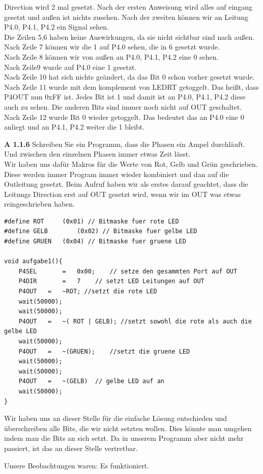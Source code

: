 \documentclass[a4paper,ngerman]{article}
\begin{document}
\begin{description}
Direction wird 2 mal gesetzt. Nach der ersten Anweisung wird alles auf eingang gesetzt und außen ist nichts zusehen. Nach der zweiten können wir an Leitung P4.0, P4.1, P4.2 ein Signal sehen.\\
Die Zeilen 5,6 haben keine Auswirkungen, da sie nicht sichtbar sind nach außen.\\
Nach Zeile 7 können wir die 1 auf P4.0 sehen, die in 6 gesetzt wurde.\\
Nach Zeile 8 können wir von außen an P4.0, P4.1, P4.2 eine 0 sehen.\\
Nach Zeile9 wurde auf P4.0 eine 1 gesetzt.\\
Nach Zeile 10 hat sich nichts geändert, da das Bit 0 schon vorher gesetzt wurde.\\
Nach Zeile 11 wurde mit dem komplement von LEDRT getoggelt. Das heißt, dass P4OUT nun 0xFF ist. Jedes Bit ist 1 und damit ist an P4.0, P4.1, P4.2 diese auch zu sehen. Die anderen Bits sind immer noch nicht auf OUT geschaltet.\\
Nach Zeile 12 wurde Bit 0 wieder getoggelt. Das bedeutet das an P4.0 eine 0 anliegt und an P4.1, P4.2  weiter die 1 bleibt.

\pagebreak

\item{\bfseries A 1.1.6} Schreiben Sie ein Programm, dass die Phasen ein Ampel durchläuft. Und zwischen den einzelnen Phasen immer etwas Zeit lässt.\\
Wir haben uns dafür Makros für die Werte von Rot, Gelb und Grün geschrieben. Diese werden immer Program immer wieder kombiniert und dan auf die Outleitung gesetzt. Beim Aufruf haben wir als erstes darauf geachtet, dass die Leitungs Direction erst auf OUT gesetzt wird, wenn wir im OUT was etwas reingeschrieben haben.

\begin{lstlisting}
#define	ROT		(0x01) // Bitmaske fuer rote LED
#define	GELB		(0x02) // Bitmaske fuer gelbe LED
#define	GRUEN	(0x04) // Bitmaske fuer gruene LED

void aufgabe1(){
	P4SEL		=	0x00;	 // setze den gesammten Port auf OUT
	P4DIR		=	7	 // setzt LED Leitungen auf OUT
	P4OUT	=	~ROT; //setzt die rote LED
	wait(50000);
	wait(50000);
	P4OUT	=	~( ROT | GELB); //setzt sowohl die rote als auch die gelbe LED
	wait(50000);
	P4OUT	= 	~(GRUEN);	 //setzt die gruene LED
	wait(50000);
	wait(50000);
	P4OUT	=	~(GELB)	 // gelbe LED auf an
	wait(50000);
}
\end{lstlisting}

Wir haben uns an dieser Stelle für die einfache Lösung entschieden und überschreiben alle Bits, die wir nicht setzten wollen. Dies könnte man umgehen indem man die Bits an sich setzt. Da in unserem Programm aber nicht mehr passiert, ist das an dieser Stelle vertretbar.

Unsere Beobachtungen waren: Es funktioniert.

\end{description}
\end{document}
